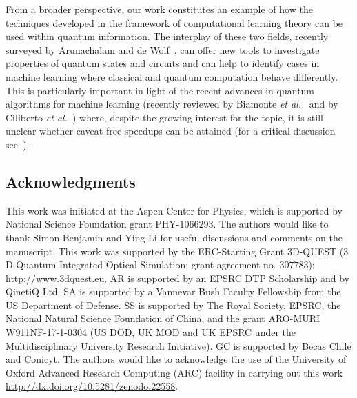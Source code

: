 \documentclass[aps,superscriptaddress,nofootinbib,twocolumn]{revtex4-1}
\begin{document}
From a broader perspective, our work constitutes an example of how the techniques developed in the framework of computational learning theory can be used within  quantum information. The interplay of these two fields, recently surveyed by Arunachalam and de Wolf~\cite{arunachalam2017survey}, can offer new tools to investigate properties of quantum states and circuits and can help to identify cases in machine learning where classical and quantum computation behave differently. 
This is particularly important in light of the recent advances in quantum algorithms for machine learning (recently reviewed by Biamonte \textit{et al.}~\cite{biamonte2017quantum} and by Ciliberto \textit{et al.}~\cite{ciliberto2017quantum}) where, despite the growing interest for the topic, it is still unclear whether caveat-free speedups can be attained (for a critical discussion see~\cite{ciliberto2017quantum,aaronson2015read}). 

\subsection*{Acknowledgments}
This work was initiated at the Aspen Center for Physics, which is supported by National Science Foundation grant PHY-$1066293$. The authors would like to thank Simon Benjamin and Ying Li for useful discussions and comments on the manuscript. This work was supported by the ERC-Starting Grant $3$D-QUEST ($3$D-Quantum Integrated Optical Simulation; grant agreement no. $307783$): \href{http://www.3dquest.eu}{http://www.3dquest.eu}. AR is supported by an EPSRC DTP Scholarship and by QinetiQ Ltd. SA is supported by a Vannevar Bush Faculty Fellowship from the US Department of Defense. SS is supported by The Royal Society, EPSRC, the National Natural Science Foundation of China, and the grant ARO-MURI W911NF-17-1-0304 (US DOD, UK MOD and UK EPSRC under the Multidisciplinary University Research Initiative). GC is supported by Becas Chile and Conicyt. The authors would like to acknowledge the use of the University of Oxford Advanced Research Computing (ARC) facility in carrying out this work  \href{http://dx.doi.org/10.5281/zenodo.22558}{http://dx.doi.org/10.5281/zenodo.22558}.

\end{document}

